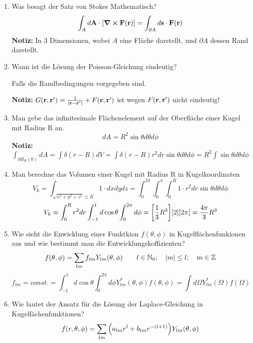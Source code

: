 \documentclass{scrartcl}
\newcommand{\rr}[1]{\frac{#1}{\abs{\vb{r}-\vb{r}'}}}
\newcommand{\ds}{\displaystyle}
\begin{document}
\begin{enumerate}
    \item Was besagt der Satz von Stokes Mathematisch?
          $$\ds \int_A d\vb A \cdot \qty[\curl \vb F(\vb r)]=
           \int_{\partial A}d\vb s\cdot \vb F(\vb r)$$
          \textbf{Notiz:} In 3 Dimensionen, wobei $A$ eine Fläche 
          darstellt,
          und $\partial A$ dessen Rand darstellt.

    \item Wann ist die Lösung der Poisson-Gleichung eindeutig?
          \begin{center}
            Falls die Randbedingungen vorgegeben sind.
          \end{center}
          \textbf{Notiz:} $G(\vb r, \vb r')=\rr{1} + F(\vb r, \vb r')$ 
          ist wegen $F(\vb r, \vb r')$ nicht eindeutig!
          
    \item Man gebe das infinitesimale Flächenelement auf der Oberfläche 
          einer Kugel mit Radius R an.
          $$\ds dA = R^2\sin\theta d\theta d\phi$$
          \textbf{Notiz:} $\ds\int_{\partial B_R(0)} dA=\int\delta(r-R)dV
           =\int \delta(r-R)r^2dr\sin\theta d\theta d\phi
           =R^2 \int \sin\theta d\theta d\phi$

    \item Man berechne das Volumen einer Kugel mit Radius R 
          in Kugelkoordinaten\\
          $$\ds V_k=\int_{\sqrt{x^2+y^2+z^2}\le R} 1\cdot dxdydz
           =\int_0^{2\pi}\int_0^\pi\int_0^R 1\cdot r^2dr 
            \sin\theta d\theta d\phi$$
          $$\ds V_k=\int_0^R r^2 dr \int_{-1}^{1} d\cos\theta 
                   \int_0^{2\pi}d\phi
           =\qty[\frac{1}{3}R^3]\qty[2]\qty[2\pi]=\frac{4\pi}{3}R^3$$

    \item Wie sieht die Enwicklung einer Funktkion $f(\theta,\phi)$ in
          Kugelflächenfunkionen aus und wie bestimmt man die 
          Entwicklungskoffizienten?
          $$\ds f(\theta, \phi)=\sum_{lm} f_{lm}Y_{lm}(\theta,\phi)
          \qquad l\in \mathbb{N}_0;\quad \abs{m}\le l; 
          \quad m\in\mathbb{Z}$$
          $$\ds f_{lm}=const.
           =\int_{-1}^{1} d\cos\theta\int_0^{2\pi}d\phi 
           Y^*_{lm}(\theta,\phi)f(\theta,\phi)
           =\int d\Omega Y^*_{lm}(\Omega)f(\Omega)$$

    \item Wie lautet der Ansatz für die Lösung der Laplace-Gleichung in
          Kugelfächenfunktionen?\\
          $$f(r,\theta,\phi)=
          \sum_{lm}\qty(a_{lm}r^l+b_{lm}r^{-(l+1)})Y_{lm}(\theta,\phi)$$
           

\end{enumerate}
\end{document}
